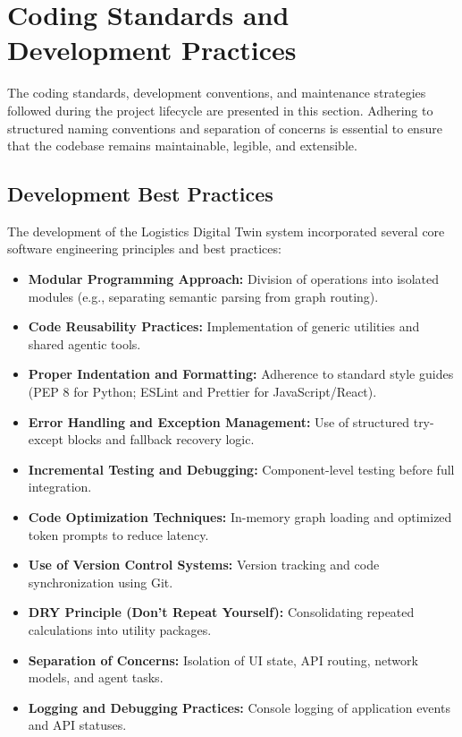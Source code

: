 \section[Coding Standards and Development Practices]{Coding Standards and Development Practices}
The coding standards, development conventions, and maintenance strategies followed during the project lifecycle are presented in this section. Adhering to structured naming conventions and separation of concerns is essential to ensure that the codebase remains maintainable, legible, and extensible.

\subsection[Development Best Practices]{Development Best Practices}
The development of the Logistics Digital Twin system incorporated several core software engineering principles and best practices:

\begin{itemize}
    \item \textbf{Modular Programming Approach:} Division of operations into isolated modules (e.g., separating semantic parsing from graph routing).
    \item \textbf{Code Reusability Practices:} Implementation of generic utilities and shared agentic tools.
    \item \textbf{Proper Indentation and Formatting:} Adherence to standard style guides (PEP 8 for Python; ESLint and Prettier for JavaScript/React).
    \item \textbf{Error Handling and Exception Management:} Use of structured try-except blocks and fallback recovery logic.
    \item \textbf{Incremental Testing and Debugging:} Component-level testing before full integration.
    \item \textbf{Code Optimization Techniques:} In-memory graph loading and optimized token prompts to reduce latency.
    \item \textbf{Use of Version Control Systems:} Version tracking and code synchronization using Git.
    \item \textbf{DRY Principle (Don’t Repeat Yourself):} Consolidating repeated calculations into utility packages.
    \item \textbf{Separation of Concerns:} Isolation of UI state, API routing, network models, and agent tasks.
    \item \textbf{Logging and Debugging Practices:} Console logging of application events and API statuses.
\end{itemize}

